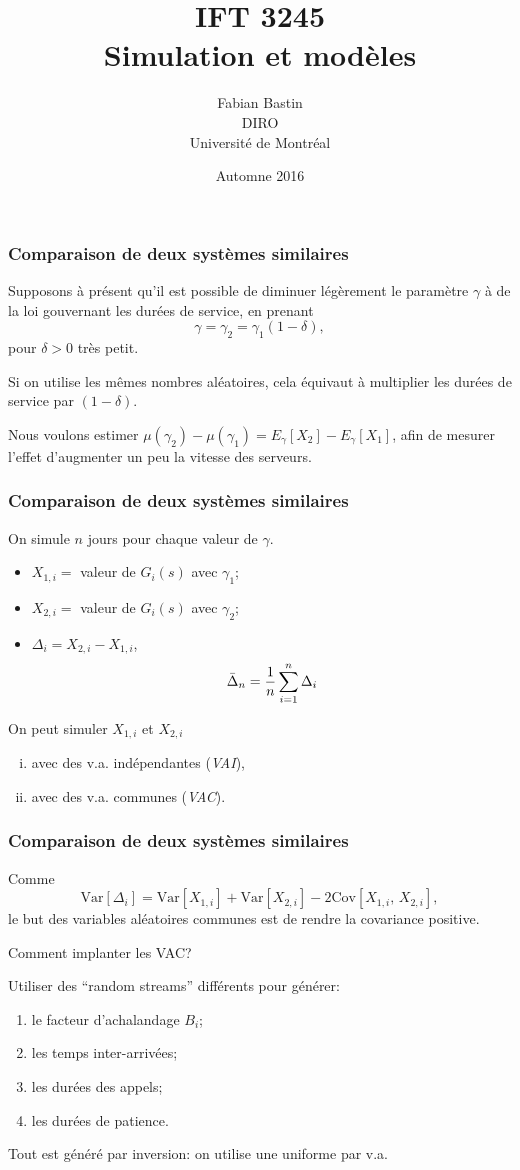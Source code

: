 \documentclass[t,usepdftitle=false]{beamer}
\title[IFT3245]{IFT 3245\\Simulation et modèles}
\author[Fabian Bastin]{Fabian Bastin\\DIRO\\Université de Montréal}
\date{Automne 2016}
\def\Var{\mbox{Var}}
\def\Cov{\mbox{Cov}}
\begin{document}
\frame{\titlepage}

\begin{frame}
\frametitle{Comparaison de deux systèmes similaires}

Supposons à présent qu'il est possible de diminuer légèrement le paramètre $\gamma$ à de la loi gouvernant les durées de service, en prenant
\[
  \gamma = {\gamma_2} = \gamma_1(1-\delta),
\]
pour ${\delta} > 0$ très petit.

\mbox{}

Si on utilise les m\^emes nombres aléatoires, cela équivaut \`a multiplier
les durées de service par $(1-\delta)$.

\mbox{}

Nous voulons estimer $\mu(\gamma_2) - \mu(\gamma_1) = E_\gamma[X_2] - E_\gamma[X_1]$,
afin de mesurer l'effet d'augmenter un peu la vitesse des serveurs.

\end{frame}

\begin{frame}
\frametitle{Comparaison de deux systèmes similaires}

On simule $n$ jours pour chaque valeur de $\gamma$.
\begin{itemize}
\item
${X_{1,i}}=$ valeur de $G_i(s)$ avec $\gamma_1$;
\item
${X_{2,i}}=$ valeur de $G_i(s)$ avec $\gamma_2$;
\item
${\Delta_i} = X_{2,i}-X_{1,i}$,
\[
  {\bar\Delta_n} = {1\over n} \sum_{i=1}^n \Delta_i
\]
\end{itemize}

\mbox{}

On peut simuler $X_{1,i}$ et $X_{2,i}$
\begin{enumerate}[(i)]
\item
avec des v.a.{} indépendantes (\emph{VAI}),
\item
avec des v.a.{} communes (\emph{VAC}).
\end{enumerate}

\end{frame}

\begin{frame}
\frametitle{Comparaison de deux systèmes similaires}

Comme
\[
  \Var[\Delta_i] = \Var[X_{1,i}] + \Var[X_{2,i}] - 2\Cov[X_{1,i},\,X_{2,i}],
\]
le but des variables aléatoires communes est de rendre la covariance positive.

\mbox{}

Comment implanter les VAC?

\mbox{}

Utiliser des ``random streams'' différents pour générer:
\begin{enumerate}
\item
le facteur d'achalandage $B_i$;
\item
les temps inter-arrivées;
\item
les durées des appels;
\item
les durées de patience.
\end{enumerate}
Tout est généré par inversion:  on utilise une uniforme par v.a.

\end{frame}
\end{document}

